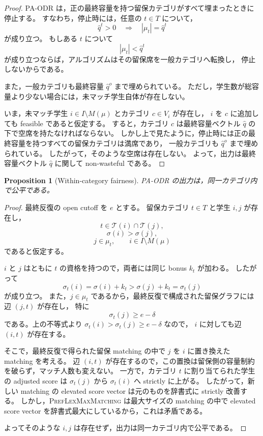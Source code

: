 \documentclass[
  12pt,
  a4paper,
  oneside,
  onecolumn,
  titlepage,
  final
]{jsarticle}
\newtheorem{proposition}{Proposition}
\newcommand{\1}{\mathbf{1}}
\begin{document}
\begin{proof}
\textsc{PA-ODR} は，正の最終容量を持つ留保カテゴリがすべて埋まったときに停止する。
すなわち，停止時には，任意の $t\in T$ について，
\[
    \hat q^t>0
    \quad\Longrightarrow\quad
    |\mu_t|=\hat q^t
\]
が成り立つ。
もしある $t$ について
\[
    |\mu_t|<\hat q^t
\]
が成り立つならば，アルゴリズムはその留保席を一般カテゴリへ転換し，
停止しないからである。

また，一般カテゴリも最終容量 $\hat q^o$ まで埋められている。
ただし，学生数が総容量より少ない場合には，未マッチ学生自体が存在しない。

いま，未マッチ学生 $i\in I\setminus M(\mu)$ とカテゴリ $c\in V_i$ が存在し，
$i$ を $c$ に追加しても feasible であると仮定する。
すると，カテゴリ $c$ は最終容量ベクトル $\hat q$ の下で空席を持たなければならない。
しかし上で見たように，停止時には正の最終容量を持つすべての留保カテゴリは満席であり，
一般カテゴリも $\hat q^o$ まで埋められている。
したがって，そのような空席は存在しない。
よって，出力は最終容量ベクトル $\hat q$ に関して
non-wasteful である。
\end{proof}

\begin{proposition}[Within-category fairness]
\label{prop:pa-odr-within}
\textsc{PA-ODR} の出力は，同一カテゴリ内で公平である。
\end{proposition}

\begin{proof}
最終反復の open cutoff を $e$ とする。
留保カテゴリ $t\in T$ と学生 $i,j$ が存在し，
\[
    t\in\mathcal T(i)\cap\mathcal T(j),
\]
\[
    \sigma(i)>\sigma(j),
\]
\[
    j\in\mu_t,
    \qquad
    i\in I\setminus M(\mu)
\]
であると仮定する。

$i$ と $j$ はともに $t$ の資格を持つので，両者には同じ bonus $k_t$ が加わる。
したがって
\[
    \sigma_t(i)=\sigma(i)+k_t>\sigma(j)+k_t=\sigma_t(j)
\]
が成り立つ。
また，$j\in\mu_t$ であるから，最終反復で構成された留保グラフには辺 $(j,t)$ が存在し，
特に
\[
    \sigma_t(j)\ge e-\delta
\]
である。上の不等式より $\sigma_t(i)>\sigma_t(j)\ge e-\delta$ なので，
$i$ に対しても辺 $(i,t)$ が存在する。

そこで，最終反復で得られた留保 matching の中で $j$ を $i$ に置き換えた matching を考える。
辺 $(i,t)$ が存在するので，この置換は留保側の容量制約を破らず，マッチ人数も変えない。
一方で，カテゴリ $t$ に割り当てられた学生の adjusted score は
$\sigma_t(j)$ から $\sigma_t(i)$ へ strictly に上がる。
したがって，新しい matching の elevated score vector は元のものを辞書式に strictly 改善する。
しかし，\textsc{PrefLexMaxMatching} は最大サイズの matching の中で
elevated score vector を辞書式最大にしているから，これは矛盾である。

よってそのような $i,j$ は存在せず，出力は同一カテゴリ内で公平である。
\end{proof}
\end{document}
